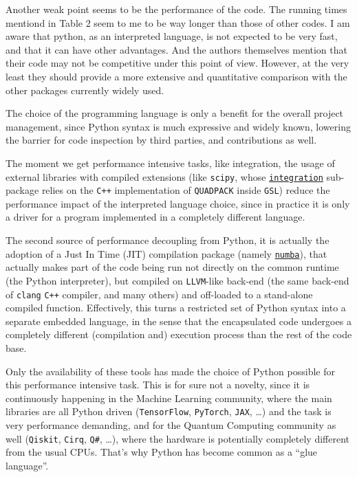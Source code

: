 \documentclass[a4paper,11pt]{article}
\begin{document}
\begin{response}{Another weak point seems to be the performance of the code. The running times
mentiond in Table 2 seem to me to be way longer than those of other codes. I am
aware that python, as an interpreted language, is not expected to be very fast,
and that it can have other advantages. And the authors themselves mention that
their code may not be competitive under this point of view. However, at the very
least they should provide a more extensive and quantitative comparison with the
other packages currently widely used.}

The choice of the programming language is only a benefit for the overall
project management, since Python syntax is much expressive and widely known,
lowering the barrier for code inspection by third parties, and contributions as
well.

The moment we get performance intensive tasks, like integration, the usage of
external libraries with compiled extensions (like \texttt{scipy}, whose
\href{https://scipy.github.io/devdocs/tutorial/integrate.html}{\texttt{integration}}
sub-package relies on the \texttt{C++} implementation of \texttt{QUADPACK}
inside \texttt{GSL}) reduce the performance impact of the interpreted language
choice, since in practice it is only a driver for a program implemented in a
completely different language.

The second source of performance decoupling from Python, it is actually the
adoption of a Just In Time (JIT) compilation package (namely
\href{https://numba.pydata.org/}{\texttt{numba}}), that actually makes part of
the code being run not directly on the common runtime (the Python interpreter),
but compiled on \texttt{LLVM}-like back-end (the same back-end of
\texttt{clang} \texttt{C++} compiler, and many others) and off-loaded to a
stand-alone compiled function.
Effectively, this turns a restricted set of Python syntax into a separate
embedded language, in the sense that the encapsulated code undergoes a
completely different (compilation and) execution process than the rest of the
code base.

Only the availability of these tools has made the choice of Python possible for
this performance intensive task.
This is for sure not a novelty, since it is continuously happening in the
Machine Learning community, where the main libraries are all Python driven
(\texttt{TensorFlow}, \texttt{PyTorch}, \texttt{JAX}, \dots) and the task is
very performance demanding, and for the Quantum Computing community as well
(\texttt{Qiskit}, \texttt{Cirq}, \texttt{Q\#}, \dots), where the hardware is
potentially completely different from the usual CPUs.  That's why Python has
become common as a \enquote{glue language}.


\end{response}
\end{document}
